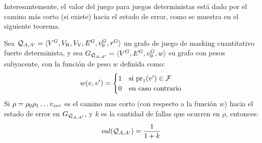 	Interesantemente, el valor del juego para juegos deterministas está dado por el camino más corto (si existe) hacia el estado de error, como se muestra en el siguiente teorema.
\begin{theorem}\label{thm:det-games} Sea  $\mathcal{Q}_{A, A'} = \langle V^G, V_{\mathrm{R}},V_{\mathrm{V}}, E^G, v_0^G, \mathit{r}^G \rangle$ un grafo de juego de masking cuantitativo fuerte determinista,
y sea  $G_{\mathcal{Q}_{A, A'}} = \langle V^G,  E^G, v_0^G, w \rangle$ su grafo con pesos subyacente, con la función de peso $w$ 
definida como:
\[
w(v, v') =
\begin{cases} 1 & \text{si $\operatorname{pr}_{1}(v') \in \mathcal{F}$} \\
		      0 & \text{en caso contrario}	 
\end{cases}
\]
	Si $\rho = \rho_0 \rho_1  \dots v_{\mathit{err}}$ es el camino mas corto (con respecto a la función $w$)
hacia el estado de error en $G_{\mathcal{Q}_{A, A'}}$, y $k$ es la cantidad de fallas que ocurren en $\rho$, entonces: 
\[
	\mathit{val}(\mathcal{Q}_{A, A'}) = \frac{1}{1+k}
\]
\end{theorem}
